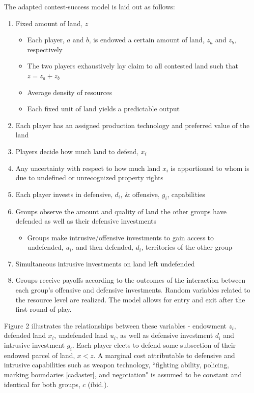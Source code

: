 \documentclass[11pt, oneside]{article}
\begin{document}
The adapted contest-success model is laid out as follows:

\begin{enumerate}
\item Fixed amount of land, $z$
\begin{itemize}
\item Each player, $a$ and $b$, is endowed a certain amount of land, $z_a$ and $z_b$, respectively
\item The two players exhaustively lay claim to all contested land such that $z=z_a+z_b$
\item Average density of resources
\item Each fixed unit of land yields a predictable output
\end{itemize}
\item Each player has an assigned production technology and preferred value of the land
\item Players decide how much land to defend, $x_i$
\item Any uncertainty with respect to how much land $x_i$ is apportioned to whom is due to undefined or unrecognized property rights
\item Each player invests in defensive, $d_i$, \& offensive, $g_i$, capabilities  
\item  Groups observe the amount and quality of land the other groups have defended as well as their defensive investments
\begin{itemize}
\item Groups make intrusive/offensive investments to gain access to undefended, $u_i$, and then defended, $d_i$, territories of the other group
\end{itemize}
\item Simultaneous intrusive investments on land left undefended
\item Groups receive payoffs according to the outcomes of the interaction between each group's offensive and defensive investments. Random variables related to the resource level are realized. The model allows for entry and exit after the first round of play.
\end{enumerate}

\noindent Figure 2 illustrates the relationships between these variables - endowment $z_i$, defended land $x_i$, undefended land $u_i$, as well as defensive investment $d_i$ and intrusive investment $g_i$. Each player elects to defend some subsection of their endowed parcel of land, $x < z$. A marginal cost attributable to defensive and intrusive capabilities such as weapon technology, ``fighting ability, policing, marking boundaries [cadaster], and negotiation" is assumed to be constant and identical for both groups, $c$ (ibid.).
\end{document}

